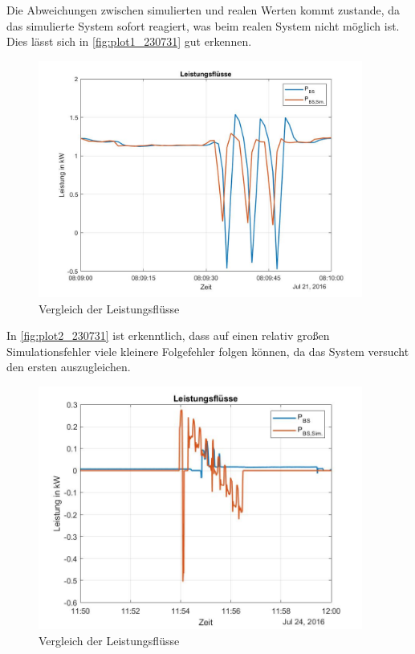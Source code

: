 Die Abweichungen zwischen simulierten und realen Werten kommt zustande, da das simulierte System sofort reagiert, was beim realen System nicht möglich ist. Dies lässt sich in \autoref{fig:plot1_230731} gut erkennen.
\begin{figure}[H]
    \centering
    \includegraphics[width=0.95\textwidth]{Abbildungen/8.09.jpg}
    \caption{Vergleich der Leistungsflüsse}
    \label{fig:plot1_230731}
\end{figure}

In \autoref{fig:plot2_230731} ist erkenntlich, dass auf einen relativ großen Simulationsfehler viele kleinere Folgefehler folgen können, da das System versucht den ersten auszugleichen.

\begin{figure}[H]
    \centering
    \includegraphics[width=0.95\textwidth]{Abbildungen/11.54.jpg}
    \caption{Vergleich der Leistungsflüsse}
    \label{fig:plot2_230731}
\end{figure}


